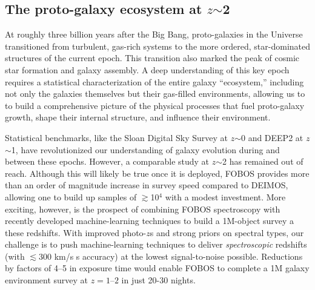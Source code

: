 


\noindent{}

\subsection{The proto-galaxy ecosystem at $z$$\sim$2}
\label{sec:z2galaxies}

At roughly three billion years after the Big Bang, proto-galaxies in
the Universe transitioned from turbulent, gas-rich systems to the
more ordered, star-dominated structures of the current epoch. This
transition also marked the peak of cosmic star formation and galaxy
assembly. A deep understanding of this key epoch requires a
statistical characterization of the entire galaxy ``ecosystem,''
including not only the galaxies themselves but their gas-filled
environments, allowing us to to build a comprehensive picture of the
physical processes that fuel proto-galaxy growth, shape their
internal structure, and influence their environment.

Statistical benchmarks, like the Sloan Digital Sky Survey
\citep[SDSS][]{2000AJ....120.1579Y} at $z$$\sim$0 and DEEP2
\citep{2003SPIE.4834..161D, 2013ApJS..208....5N} at $z$$\sim$1, have
revolutionized our understanding of galaxy evolution during and
between these epochs. However, a comparable study at $z$$\sim$2 has
remained out of reach.  Although this will likely be true once it is deployed,
FOBOS provides more than an order of
magnitude increase in survey speed compared to DEIMOS, allowing one
to build up samples of $\gtrsim$10$^4$ with a modest investment. More
exciting, however, is the prospect of combining FOBOS spectroscopy
with recently developed machine-learning techniques to build a
1M-object survey a these redshifts.  With improved photo-$z$s and strong priors on
spectral types, our challenge is to push machine-learning
techniques to deliver {\it spectroscopic} redshifts (with $\lesssim$300 km/s
s accuracy) at the lowest signal-to-noise possible. Reductions
by factors of 4--5 in exposure time would enable FOBOS to complete a
1M galaxy environment survey at $z=1$--$2$ in just 20-30 nights.

